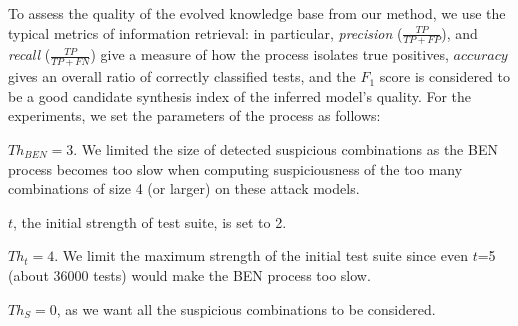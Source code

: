 \begin{tikzborder}{\cite{Gargantini16:validation}}
\begin{tikzborder}{\cite{gargantini_combinatorial_2017}}
\begin{tikzborder}{\cite{gargantini_combinatorial_2017}}
\begin{tikzborder}{\cite{garn2019}}
\bb To assess the quality of the evolved knowledge base from our method, we use the typical metrics of information retrieval: in particular, \textit{precision} ($\frac{TP}{TP+FP}$), and \textit{recall} ($\frac{TP}{TP+FN}$) give a measure of how the process isolates true positives, $accuracy$ gives an overall ratio of correctly classified tests, and the $F_1$ score is considered to be a good candidate synthesis index of the inferred model's quality. 
For the experiments, we set the parameters of the process as follows:
\begin{compactitem}
\item $Th_{BEN}=3$. We limited the size of detected suspicious combinations as the BEN process becomes too slow when computing suspiciousness of the too many combinations of size 4 (or larger) on these attack models.
\item $t$, the initial strength of test suite, is set to 2.
\item $Th_t=4$. We limit the maximum strength of the initial test suite since even $t$=5 (about 36000 tests) would make the BEN process too slow.%
\item $Th_S=0$, as %
we want all the suspicious combinations to be considered. %
\end{compactitem}\be


\end{tikzborder}
\end{tikzborder}
\end{tikzborder}
\end{tikzborder}
